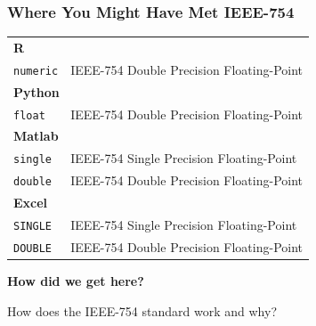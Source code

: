 \begin{frame}

\frametitle{Where You Might Have Met IEEE-754}

\vspace{\fill}

\begin{tabular}{ll}
\multicolumn{2}{l}{\textbf{R}} \\
\texttt{numeric} & IEEE-754 Double Precision Floating-Point \\
\multicolumn{2}{l}{\textbf{Python}} \\
\texttt{float} &  IEEE-754 Double Precision Floating-Point \\
\multicolumn{2}{l}{\textbf{Matlab}} \\
\texttt{single} & IEEE-754 Single Precision Floating-Point \\
\texttt{double} & IEEE-754 Double Precision Floating-Point \\
\multicolumn{2}{l}{\textbf{Excel}} \\
\texttt{SINGLE} & IEEE-754 Single Precision Floating-Point \\
\texttt{DOUBLE} & IEEE-754 Double Precision Floating-Point
\end{tabular}

\vspace{\fill}

\end{frame}

\begin{frame}

\vspace{\fill}

\begin{center}

\huge \textbf{How did we get here?}

\vspace{0.5in}

\large How does the IEEE-754 standard work and why?

\end{center}

\vspace{\fill}

\end{frame}
